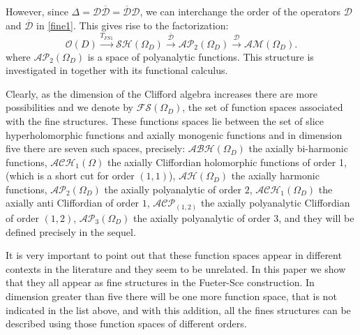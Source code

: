 \documentclass[reqno,11pt]{amsart}
\numberwithin{equation}{section}
\theoremstyle{definition}
\begin{document}
However, since $\Delta=\mathcal{D} \mathcal{\overline{D}}= \mathcal{\overline{D}}\mathcal{D}$, we can interchange the order of the operators $ \mathcal{D}$ and $ \mathcal{\overline{D}}$ in \eqref{fine1}. This gives rise to the factorization:
\begin{equation}
\mathcal{O}(D) \overset{T_{FS1}}{\longrightarrow} \mathcal{SH}(\Omega_D)\overset{\mathcal{\overline{D}}}{\longrightarrow} \mathcal{AP}_2(\Omega_D)\overset{\mathcal{D}}{\longrightarrow}\mathcal{AM}(\Omega_D).
\end{equation}
where $\mathcal{AP}_2(\Omega_D)$ is a space of polyanalytic functions. This structure is investigated in \cite{CDPS1} together with its functional calculus.

\medskip
Clearly, as the dimension of the Clifford algebra increases
there are more possibilities and we denote by
 $\mathcal{FS}(\Omega_D)$, the set of function
spaces associated with the fine structures.
These
 functions spaces  lie between the set of slice hyperholomorphic functions and axially monogenic functions and in dimension five there are seven such spaces, precisely:
$ \mathcal{ABH}(\Omega_D)$ the axially bi-harmonic functions,
$ \mathcal{ACH}_1(\Omega)$ the axially Cliffordian holomorphic functions of order 1,
(which is a short cut for order $(1,1)$),
$ \mathcal{AH}(\Omega_D)$ the axially harmonic functions,
$ \mathcal{AP}_2(\Omega_{D})$ the axially polyanalytic of order $2$,
$ \mathcal{ACH}_1(\Omega_D)$ the axially anti Cliffordian of order $1$,
$ \mathcal{ACP}_{(1,2)}$ the axially polyanalytic Cliffordian of order $(1,2)$,
$ \mathcal{AP}_3(\Omega_{D})$ the axially polyanalytic of order $3$,
and they will be defined precisely in the sequel.

\medskip
It is very important to point out that these function spaces appear in different contexts
in the literature and they seem to be unrelated. In this paper we show that they all appear as fine structures in the Fueter-Sce
construction.
In dimension greater than five there will be one more function
space, that is not indicated in the list above, and with this addition, all the fines structures can be described using those function spaces of different orders.
\end{document}
